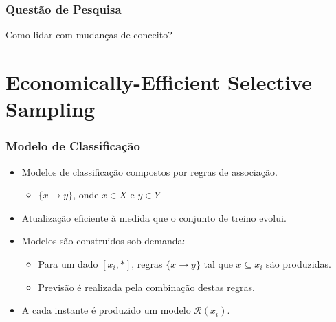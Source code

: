 \documentclass[14pt]{beamer}
\begin{document}
\begin{frame}\frametitle{Questão de Pesquisa}

\begin{center}
\large{Como lidar com mudanças de conceito?}
\end{center}
\end{frame}

\section{Economically-Efficient Selective Sampling}
\begin{frame}\frametitle{Modelo de Classificação}
\begin{itemize}
\item Modelos de classificação compostos por regras de associação.
  \begin{itemize}
    \item $\{x \to y\}$, onde $x \in X$ e $y \in Y$
  \end{itemize}
\item Atualização eficiente à medida que o conjunto de treino evolui.
\item Modelos são construidos sob demanda:
  \begin{itemize}
    \item Para um dado $[x_i, *]$, regras $\{x \to y\}$ tal que $x \subseteq x_i$ são produzidas.
    \item Previsão é realizada pela combinação destas regras.
  \end{itemize}
\item A cada instante é produzido um modelo $\mathcal{R}(x_i)$.
\end{itemize}
\end{frame}
\end{document}
